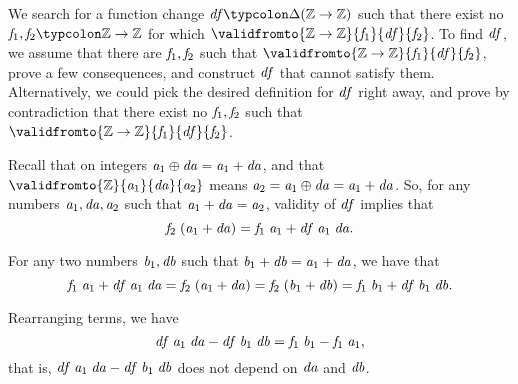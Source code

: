 \begin{example}
  We search for a function change \ensuremath{\Varid{df}\typcolon\Delta (\mathbb{Z}\to \mathbb{Z})} such
that there exist no \ensuremath{\Varid{f}_{1},\Varid{f}_{2}\typcolon\mathbb{Z}\to \mathbb{Z}} for which
\ensuremath{\validfromto{\mathbb{Z}\to \mathbb{Z}}{\Varid{f}_{1}}{\Varid{df}}{\Varid{f}_{2}}}. To find \ensuremath{\Varid{df}}, we assume that there are \ensuremath{\Varid{f}_{1},\Varid{f}_{2}} such that \ensuremath{\validfromto{\mathbb{Z}\to \mathbb{Z}}{\Varid{f}_{1}}{\Varid{df}}{\Varid{f}_{2}}}, prove a few consequences, and construct
\ensuremath{\Varid{df}} that cannot satisfy them. Alternatively, we could pick the
desired definition for \ensuremath{\Varid{df}} right away, and prove by
contradiction that there exist no \ensuremath{\Varid{f}_{1},\Varid{f}_{2}} such that \ensuremath{\validfromto{\mathbb{Z}\to \mathbb{Z}}{\Varid{f}_{1}}{\Varid{df}}{\Varid{f}_{2}}}.

Recall that on integers \ensuremath{\Varid{a}_{1}\oplus \Varid{da}\mathrel{=}\Varid{a}_{1}\mathbin{+}\Varid{da}}, and that
\ensuremath{\validfromto{\mathbb{Z}}{\Varid{a}_{1}}{\Varid{da}}{\Varid{a}_{2}}} means \ensuremath{\Varid{a}_{2}\mathrel{=}\Varid{a}_{1}\oplus \Varid{da}\mathrel{=}\Varid{a}_{1}\mathbin{+}\Varid{da}}.
So, for any numbers \ensuremath{\Varid{a}_{1},\Varid{da},\Varid{a}_{2}} such that \ensuremath{\Varid{a}_{1}\mathbin{+}\Varid{da}\mathrel{=}\Varid{a}_{2}}, validity of \ensuremath{\Varid{df}} implies that
\[\mathit{f}_{2}\;(\mathit{a}_{1}\mathbin{+}\mathit{da})\mathrel{=}\mathit{f}_{1}\;\mathit{a}_{1}\mathbin{+}\mathit{df}\;\mathit{a}_{1}\;\mathit{da}.\]

For any two numbers \ensuremath{\Varid{b}_{1},\Varid{db}} such that \ensuremath{\Varid{b}_{1}\mathbin{+}\Varid{db}\mathrel{=}\Varid{a}_{1}\mathbin{+}\Varid{da}},
we have that
\[\mathit{f}_{1}\;\mathit{a}_{1}\mathbin{+}\mathit{df}\;\mathit{a}_{1}\;\mathit{da}\mathrel{=}\mathit{f}_{2}\;(\mathit{a}_{1}\mathbin{+}\mathit{da})\mathrel{=}\mathit{f}_{2}\;(\mathit{b}_{1}\mathbin{+}\mathit{db})\mathrel{=}\mathit{f}_{1}\;\mathit{b}_{1}\mathbin{+}\mathit{df}\;\mathit{b}_{1}\;\mathit{db}.\]

Rearranging terms, we have
\[\mathit{df}\;\mathit{a}_{1}\;\mathit{da}\mathbin{-}\mathit{df}\;\mathit{b}_{1}\;\mathit{db}\mathrel{=}\mathit{f}_{1}\;\mathit{b}_{1}\mathbin{-}\mathit{f}_{1}\;\mathit{a}_{1},\]
that is, \ensuremath{\Varid{df}\;\Varid{a}_{1}\;\Varid{da}\mathbin{-}\Varid{df}\;\Varid{b}_{1}\;\Varid{db}} does not depend on \ensuremath{\Varid{da}} and \ensuremath{\Varid{db}}.


\end{example}
